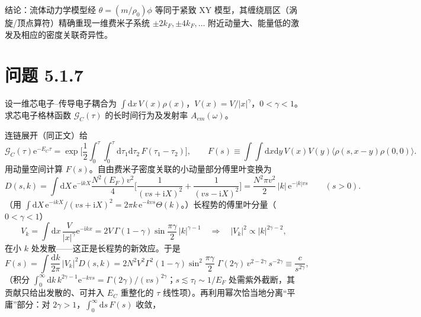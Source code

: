 结论：流体动力学模型经 $\theta=(m/\rho_0)\phi$ 等同于紧致 XY 模型，其缠绕扇区（涡旋/顶点算符）精确重现一维费米子系统 $\pm2k_F,\pm4k_F,\dots$ 附近动量大、能量低的激发及相应的密度关联奇异性。

\section*{问题 5.1.7}
\begin{problem}
设一维芯电子--传导电子耦合为 $\int\mathrm{d}x\,V(x)\rho(x)$，$V(x)=V/|x|^{\gamma}$，$0<\gamma<1$。求芯电子格林函数 $\mathcal{G}_C(\tau)$ 的长时间行为及发射率 $A_{em}(\omega)$。
\end{problem}
\solution

连链展开（同正文）给
\begin{equation*}
\mathcal{G}_C(\tau)\mathrm{e}^{-E_C\tau}
=\exp\Big[\frac{1}{2}\int_0^{\tau}\!\!\int_0^{\tau}\mathrm{d}\tau_1\mathrm{d}\tau_2\,F(\tau_1-\tau_2)\Big],\qquad
F(s)\equiv\int\!\!\int\mathrm{d}x\mathrm{d}y\,V(x)V(y)\langle\rho(s,x-y)\rho(0,0)\rangle .
\end{equation*}
用动量空间计算 $F(s)$。自由费米子密度关联的小动量部分傅里叶变换为
\begin{equation*}
D(s,k)=\int\mathrm{d}X\,\mathrm{e}^{-\mathrm{i}kX}\frac{N^{2}(E_F)v^{2}}{4}\Big[\frac{1}{(vs+\mathrm{i}X)^{2}}+\frac{1}{(vs-\mathrm{i}X)^{2}}\Big]
=\frac{N^{2}\pi v^{2}}{2}\,|k|\,\mathrm{e}^{-|k|vs}\qquad(s>0).
\end{equation*}
（用 $\int\mathrm{d}X\,\mathrm{e}^{-ikX}/(vs+\mathrm{i}X)^{2}=2\pi k\,\mathrm{e}^{-kvs}\Theta(k)$。）长程势的傅里叶分量（$0<\gamma<1$）
\begin{equation*}
V_k=\int\mathrm{d}x\,\frac{V}{|x|^{\gamma}}\mathrm{e}^{-\mathrm{i}kx}=2V\,\Gamma(1-\gamma)\sin\frac{\pi\gamma}{2}\,|k|^{\gamma-1}
\quad\Longrightarrow\quad |V_k|^{2}\propto|k|^{2\gamma-2},
\end{equation*}
在小 $k$ 处发散——这正是长程势的新效应。于是
\begin{equation*}
F(s)=\int\frac{\mathrm{d}k}{2\pi}\,|V_k|^{2}D(s,k)
=2N^{2}V^{2}\Gamma^{2}(1-\gamma)\sin^{2}\!\frac{\pi\gamma}{2}\;\Gamma(2\gamma)\,v^{2-2\gamma}\,s^{-2\gamma}
\equiv \frac{c}{s^{2\gamma}} ,
\end{equation*}
（积分 $\int_0^\infty\mathrm{d}k\,k^{2\gamma-1}\mathrm{e}^{-kvs}=\Gamma(2γ)/(vs)^{2γ}$；$s\lesssim\tau_l\sim1/E_F$ 处需紫外截断，其贡献只给出发散的、可并入 $E_C$ 重整化的 $\tau$ 线性项）。再利用幂次恰当地分离“平庸”部分：对 $2\gamma>1$，$\int_0^\infty\mathrm{d}s\,F(s)$ 收敛，
